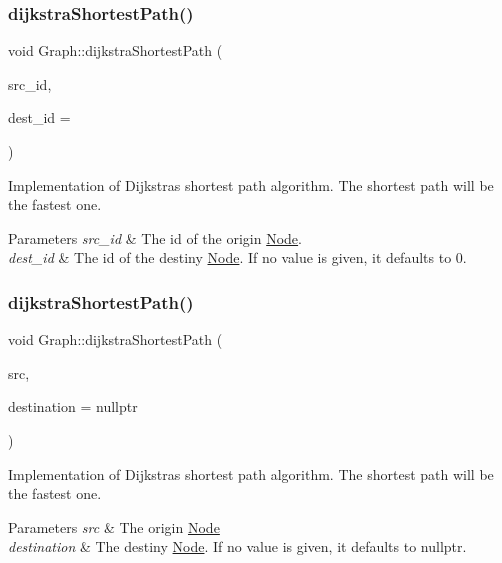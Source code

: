 \subsubsection{\texorpdfstring{dijkstra\+Shortest\+Path()}{dijkstraShortestPath()}\hspace{0.1cm}{\footnotesize\ttfamily [1/4]}}
{\footnotesize\ttfamily void Graph\+::dijkstra\+Shortest\+Path (\begin{DoxyParamCaption}\item[{node\+\_\+id}]{src\+\_\+id,  }\item[{node\+\_\+id}]{dest\+\_\+id = {} }\end{DoxyParamCaption})}

Implementation of Dijkstra\textquotesingle{}s shortest path algorithm. The shortest path will be the fastest one.


\begin{DoxyParams}{Parameters}
{\em src\+\_\+id} & The id of the origin \hyperlink{class_node}{Node}. \\
\hline
{\em dest\+\_\+id} & The id of the destiny \hyperlink{class_node}{Node}. If no value is given, it defaults to 0. \\
\hline
\end{DoxyParams}
\hypertarget{class_graph_a0fc41701fa170ab69282ae8a571fdc04}{}\label{class_graph_a0fc41701fa170ab69282ae8a571fdc04} 
\subsubsection{\texorpdfstring{dijkstra\+Shortest\+Path()}{dijkstraShortestPath()}\hspace{0.1cm}{\footnotesize\ttfamily [2/4]}}
{\footnotesize\ttfamily void Graph\+::dijkstra\+Shortest\+Path (\begin{DoxyParamCaption}\item[{\hyperlink{class_node}{Node} $\ast$}]{src,  }\item[{\hyperlink{class_node}{Node} $\ast$}]{destination = {\ttfamily nullptr} }\end{DoxyParamCaption})}

Implementation of Dijkstra\textquotesingle{}s shortest path algorithm. The shortest path will be the fastest one.


\begin{DoxyParams}{Parameters}
{\em src} & The origin \hyperlink{class_node}{Node} \\
\hline
{\em destination} & The destiny \hyperlink{class_node}{Node}. If no value is given, it defaults to nullptr. \\
\hline
\end{DoxyParams}
\hypertarget{class_graph_a751cdeb2ca841f9d44d921cf1a43ddd0}{}\label{class_graph_a751cdeb2ca841f9d44d921cf1a43ddd0} 
